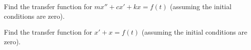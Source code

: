 \documentclass{ximera}
\begin{document}
\begin{exercise}
    Find the transfer function for $m x'' + c x' + kx = f(t)$ (assuming the initial conditions are zero).
\end{exercise}

\begin{exercise}%
    Find the transfer function for $x' + x = f(t)$ (assuming the initial conditions are zero).
\end{exercise}

\end{document}
